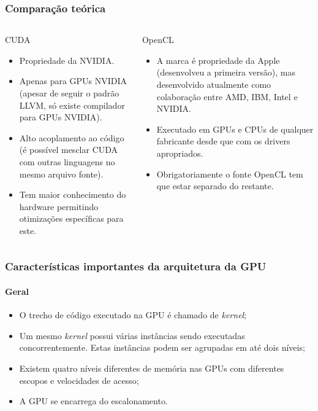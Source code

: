 \documentclass[brazil, 10pt]{beamer}
\begin{document}
\begin{frame}
  \frametitle{Comparação teórica}

\begin{columns}
  \begin{column}{.5\textwidth}
    CUDA
    
    \begin{itemize}
      \item Propriedade da NVIDIA.
      \item Apenas para GPUs NVIDIA (apesar de seguir o padrão LLVM, só existe compilador para GPUs NVIDIA).
      \item Alto acoplamento ao código (é possível mesclar CUDA com outras linguagens no mesmo arquivo fonte).
      \item Tem maior conhecimento do hardware permitindo otimizações específicas para este.
    \end{itemize}
  \end{column}
  \begin{column}{.5\textwidth}
    OpenCL    
    
    \begin{itemize}
      \item A marca é propriedade da Apple (desenvolveu a primeira versão), mas desenvolvido atualmente como colaboração entre AMD, IBM, Intel e NVIDIA.
      \item Executado em GPUs e CPUs de qualquer fabricante desde que com os drivers apropriados.
      \item Obrigatoriamente o fonte OpenCL tem que estar separado do restante.
    \end{itemize}
  \end{column}
\end{columns}
\end{frame}

\begin{frame}
  \frametitle{Características importantes da arquitetura da GPU}
  \framesubtitle{Geral}
  
  \begin{itemize}
    \item O trecho de código executado na GPU é chamado de \textit{kernel};
    \item Um mesmo \textit{kernel} possui várias instâncias sendo executadas concorrentemente. Estas instâncias podem ser agrupadas em até dois níveis;
    \item Existem quatro níveis diferentes de memória nas GPUs com diferentes escopos e velocidades de acesso;
    \item A GPU se encarrega do escalonamento.
  \end{itemize}
\end{frame}
\end{document}
